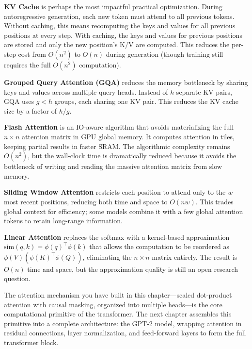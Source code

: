 \begin{keyconcept}
  \textbf{KV Cache} is perhaps the most impactful practical optimization.
  During autoregressive generation, each new token must attend to all previous
  tokens. Without caching, this means recomputing the keys and values for all
  previous positions at every step. With caching, the keys and values for
  previous positions are stored and only the new position's K/V are computed.
  This reduces the per-step cost from $O(n^2)$ to $O(n)$ during generation
  (though training still requires the full $O(n^2)$ computation).

  \textbf{Grouped Query Attention (GQA)} reduces the memory bottleneck by
  sharing keys and values across multiple query heads. Instead of $h$ separate
  KV pairs, GQA uses $g < h$ groups, each sharing one KV pair. This reduces
  the KV cache size by a factor of $h/g$.

  \textbf{Flash Attention} is an IO-aware algorithm that avoids materializing
  the full $n \times n$ attention matrix in GPU global memory. It computes
  attention in tiles, keeping partial results in faster SRAM. The algorithmic
  complexity remains $O(n^2)$, but the wall-clock time is dramatically
  reduced because it avoids the bottleneck of writing and reading the massive
  attention matrix from slow memory.

  \textbf{Sliding Window Attention} restricts each position to attend only to
  the $w$ most recent positions, reducing both time and space to $O(nw)$. This
  trades global context for efficiency; some models combine it with a few
  global attention tokens to retain long-range information.

  \textbf{Linear Attention} replaces the softmax with a kernel-based
  approximation $\text{sim}(q, k) = \phi(q)^\top \phi(k)$ that allows the
  computation to be reordered as $\phi(V)(\phi(K)^\top \phi(Q))$, eliminating
  the $n \times n$ matrix entirely. The result is $O(n)$ time and space, but
  the approximation quality is still an open research question.
\end{keyconcept}

The attention mechanism you have built in this chapter---scaled dot-product
attention with causal masking, organized into multiple heads---is the core
computational primitive of the transformer. The next chapter assembles this
primitive into a complete architecture: the GPT-2 model, wrapping attention
in residual connections, layer normalization, and feed-forward layers to form
the full transformer block.

